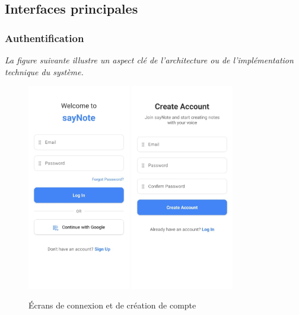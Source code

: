 \subsection{Interfaces principales}

\subsubsection{Authentification}
\noindent
\textit{La figure suivante illustre un aspect clé de l'architecture ou de l'implémentation technique du système.}
\begin{figure}[H]
    \centering
    \includegraphics[width=0.4\textwidth]{assets/docs/mobile/login-page.jpeg}
    \hfill
    \includegraphics[width=0.4\textwidth]{assets/docs/mobile/create-account-page.jpeg}
    \caption{Écrans de connexion et de création de compte}
    \label{fig:mobile-auth}
\end{figure}

